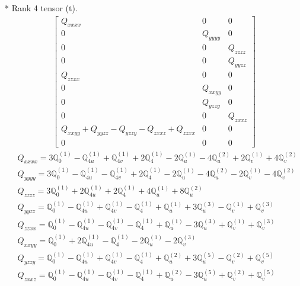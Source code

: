 \documentclass[fleqn,8pt,landscape]{jsarticle}
\begin{document}
* Rank 4 tensor (t).
\begin{align*}
\begin{bmatrix} Q_{xxxx} & 0 & 0 \\ 0 & Q_{yyyy} & 0 \\ 0 & 0 & Q_{zzzz} \\ 0 & 0 & Q_{yyzz} \\ Q_{zzxx} & 0 & 0 \\ 0 & Q_{xxyy} & 0 \\ 0 & Q_{yzzy} & 0 \\ 0 & 0 & Q_{zxxz} \\ Q_{xxyy} + Q_{yyzz} - Q_{yzzy} - Q_{zxxz} + Q_{zzxx} & 0 & 0 \\ 0 & 0 & 0 \end{bmatrix}
\end{align*}
\begin{align*}
& Q_{xxxx} = 3 \mathbb{Q}_{0}^{(1)} - \mathbb{Q}_{4u}^{(1)} + \mathbb{Q}_{4v}^{(1)} + 2 \mathbb{Q}_{4}^{(1)} - 2 \mathbb{Q}_{u}^{(1)} - 4 \mathbb{Q}_{u}^{(2)} + 2 \mathbb{Q}_{v}^{(1)} + 4 \mathbb{Q}_{v}^{(2)} \\
& Q_{yyyy} = 3 \mathbb{Q}_{0}^{(1)} - \mathbb{Q}_{4u}^{(1)} - \mathbb{Q}_{4v}^{(1)} + 2 \mathbb{Q}_{4}^{(1)} - 2 \mathbb{Q}_{u}^{(1)} - 4 \mathbb{Q}_{u}^{(2)} - 2 \mathbb{Q}_{v}^{(1)} - 4 \mathbb{Q}_{v}^{(2)} \\
& Q_{zzzz} = 3 \mathbb{Q}_{0}^{(1)} + 2 \mathbb{Q}_{4u}^{(1)} + 2 \mathbb{Q}_{4}^{(1)} + 4 \mathbb{Q}_{u}^{(1)} + 8 \mathbb{Q}_{u}^{(2)} \\
& Q_{yyzz} = \mathbb{Q}_{0}^{(1)} - \mathbb{Q}_{4u}^{(1)} + \mathbb{Q}_{4v}^{(1)} - \mathbb{Q}_{4}^{(1)} + \mathbb{Q}_{u}^{(1)} + 3 \mathbb{Q}_{u}^{(3)} - \mathbb{Q}_{v}^{(1)} + \mathbb{Q}_{v}^{(3)} \\
& Q_{zzxx} = \mathbb{Q}_{0}^{(1)} - \mathbb{Q}_{4u}^{(1)} - \mathbb{Q}_{4v}^{(1)} - \mathbb{Q}_{4}^{(1)} + \mathbb{Q}_{u}^{(1)} - 3 \mathbb{Q}_{u}^{(3)} + \mathbb{Q}_{v}^{(1)} + \mathbb{Q}_{v}^{(3)} \\
& Q_{xxyy} = \mathbb{Q}_{0}^{(1)} + 2 \mathbb{Q}_{4u}^{(1)} - \mathbb{Q}_{4}^{(1)} - 2 \mathbb{Q}_{u}^{(1)} - 2 \mathbb{Q}_{v}^{(3)} \\
& Q_{yzzy} = \mathbb{Q}_{0}^{(1)} - \mathbb{Q}_{4u}^{(1)} + \mathbb{Q}_{4v}^{(1)} - \mathbb{Q}_{4}^{(1)} + \mathbb{Q}_{u}^{(2)} + 3 \mathbb{Q}_{u}^{(5)} - \mathbb{Q}_{v}^{(2)} + \mathbb{Q}_{v}^{(5)} \\
& Q_{zxxz} = \mathbb{Q}_{0}^{(1)} - \mathbb{Q}_{4u}^{(1)} - \mathbb{Q}_{4v}^{(1)} - \mathbb{Q}_{4}^{(1)} + \mathbb{Q}_{u}^{(2)} - 3 \mathbb{Q}_{u}^{(5)} + \mathbb{Q}_{v}^{(2)} + \mathbb{Q}_{v}^{(5)}
\end{align*}
\end{document}
